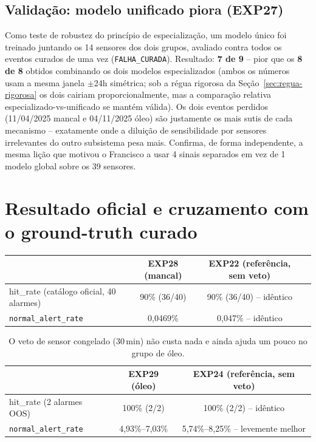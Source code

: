 \documentclass[11pt,a4paper]{article}
\begin{document}
\subsection{Validação: modelo unificado piora (EXP27)}
\label{sec:unificado}

Como teste de robustez do princípio de especialização, um modelo único
foi treinado juntando os 14 sensores dos dois grupos, avaliado contra
todos os eventos curados de uma vez (\texttt{FALHA\_CURADA}). Resultado:
\textbf{7 de 9} -- pior que os \textbf{8 de 8} obtidos combinando os
dois modelos especializados (ambos os números usam a mesma janela
$\pm$24h simétrica; sob a régua rigorosa da Seção~\ref{sec:regua-rigorosa}
os dois cairiam proporcionalmente, mas a comparação relativa
especializado-vs-unificado se mantém válida). Os dois eventos
perdidos (11/04/2025 mancal e 04/11/2025 óleo) são justamente os mais
sutis de cada mecanismo -- exatamente onde a diluição de sensibilidade
por sensores irrelevantes do outro subsistema pesa mais. Confirma, de
forma independente, a mesma lição que motivou o Francisco a usar 4
sinais separados em vez de 1 modelo global sobre os 39 sensores.

\section{Resultado oficial e cruzamento com o ground-truth curado}
\label{sec:resultado-oficial}

\begin{table}[H]
\centering
\begin{tabular}{lccc}
\toprule
& \textbf{EXP28 (mancal)} & \textbf{EXP22 (referência, sem veto)} \\
\midrule
hit\_rate (catálogo oficial, 40 alarmes) & 90\% (36/40) & 90\% (36/40) -- idêntico \\
\texttt{normal\_alert\_rate} & 0,0469\% & 0,047\% -- idêntico \\
\bottomrule
\end{tabular}
\end{table}

\begin{table}[H]
\centering
\begin{tabular}{lcc}
\toprule
& \textbf{EXP29 (óleo)} & \textbf{EXP24 (referência, sem veto)} \\
\midrule
hit\_rate (2 alarmes OOS) & 100\% (2/2) & 100\% (2/2) -- idêntico \\
\texttt{normal\_alert\_rate} & 4,93\%--7,03\% & 5,74\%--8,25\% -- levemente melhor \\
\bottomrule
\end{tabular}
\caption{O veto de sensor congelado (30\,min) não custa nada e ainda
ajuda um pouco no grupo de óleo.}
\end{table}
\end{document}
